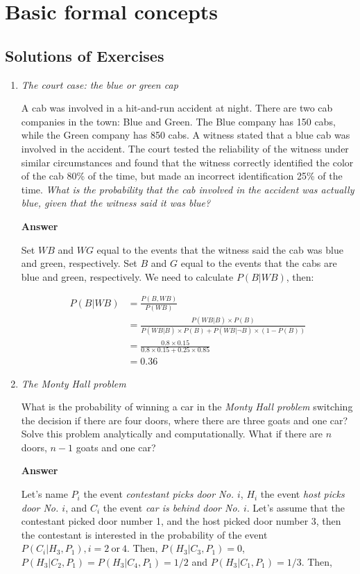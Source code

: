 \chapter{Basic formal concepts}\label{chap1}
\section*{Solutions of Exercises}\label{sec11}
\begin{enumerate}[leftmargin=*]
\item \textit{The court case: the blue or green cap}
	
A cab was involved in a hit-and-run accident at night. There are two cab companies in the town: Blue and Green. The Blue company has 150 cabs, while the Green company has 850 cabs. A witness stated that a blue cab was involved in the accident. The court tested the reliability of the witness under similar circumstances and found that the witness correctly identified the color of the cab 80\% of the time, but made an incorrect identification 25\% of the time. \textit{What is the probability that the cab involved in the accident was actually blue, given that the witness said it was blue?}
	
\textbf{Answer}
	
Set $WB$ and $WG$ equal to the events that the witness said the cab was blue and green, respectively. Set $B$ and $G$ equal to the events that the cabs are blue and green, respectively. We need to calculate $P(B|WB)$, then:
	
\begin{align}
	P(B|WB)&=\frac{P(B,WB)}{P(WB)}\\
	&=\frac{P(WB|B)\times P(B)}{P(WB|B)\times P(B)+P(WB|\lnot B)\times (1-P(B))}\nonumber\\
	&=\frac{0.8\times 0.15}{0.8\times 0.15+0.25\times 0.85}\nonumber\\
	&=0.36\nonumber
\end{align}	
	
\item \textit{The Monty Hall problem}
	
What is the probability of winning a car in the \textit{Monty Hall problem} switching the decision if there are four doors, where there are three goats and one car? Solve this problem analytically and computationally.  What if there are $n$ doors, $n-1$ goats and one car?
	
\textbf{Answer}
	
Let's name $P_i$ the event \textit{contestant picks door No. $i$}, $H_i$ the event \textit{host picks door No. $i$}, and $C_i$ the event \textit{car is behind door No. $i$}. Let's assume that the contestant picked door number 1, and the host picked door number 3, then the contestant is interested in the probability of the event $P(C_i|H_3,P_1), i = 2 \ \text{or} \ 4$. Then, $P(H_3|C_3,P_1)=0$, $P(H_3|C_2,P_1)=P(H_3|C_4,P_1)=1/2$ and $P(H_3|C_1,P_1)=1/3$. Then,  
	

\end{enumerate}
